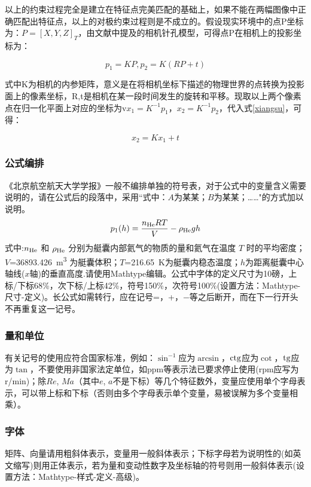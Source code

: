\documentclass[10.5pt,twocolumn]{jbuaa}
\begin{document}
以上的约束过程完全是建立在特征点完美匹配的基础上，如果不能在两幅图像中正确匹配出特征点，以上的对极约束过程则是不成立的。假设现实环境中的点P坐标为：$ P = [X,Y,Z]_{T} $，由文献\cite{gaoxiang14slam}中提及的相机针孔模型，可得点P在相机上的投影坐标为：

\begin{equation}
\label{xiangsu}
p_{1} = KP,p_{2} = K(RP+t)
\end{equation}

式中K为相机的内参矩阵，意义是在将相机坐标下描述的物理世界的点转换为投影面上的像素坐标，R,t是相机在某一段时间发生的旋转和平移。现取以上两个像素点在归一化平面上对应的坐标为v$ x_{1} = K^{-1}p_{1} $，$ x_{2} = K^{-1}p_{2} $，代入式\ref{xiangsu}，可得：

\begin{equation}
\label{guiyi}
x_{2} = Kx_{1}+t
\end{equation}


\subsubsection{公式编排}
\label{labSecForm}
《北京航空航天大学学报》一般不编排单独的符号表，对于公式中的变量含义需要说明的，请在公式后的段落中，采用``式中：$A$为某某；$B$为某某；……"的方式加以说明。
\begin{equation}
\label{eqnLabelp}
p_1 (h) = \dfrac{n_{\textnormal{He}}RT}{V}-\rho_{\textnormal{He}}gh
\end{equation}
式中:$n_{\textnormal{He}}$ 和 $\rho_{\textnormal{He}}$ 分别为艇囊内部氦气的物质的量和氦气在温度 $T$ 时的平均密度；
$V$=\SI{36893.426}{\cubic\meter}%
为艇囊体积；$T$=\SI{216.65}{\kelvin}为艇囊内稳态温度；$h$为距离艇囊中心轴线($x$轴)的垂直高度.请使用Mathtype编辑。公式中字体的定义尺寸为10磅，上标/下标68\%，次下标/上标42\%，符号150\%，次符号100\%(设置方法：Mathtype-尺寸-定义)。长公式如需转行，应在记号=，+，$-$等之后断开，而在下一行开头不再重复这一记号。

\subsubsection{量和单位}
有关记号的使用应符合国家标准，例如：$\sin^{-1}$应为$\arcsin$，$\rm ctg$应为$\cot$，$\rm tg$应为$\tan$，不要使用非国家法定单位，如ppm等表示法已要求停止使用(rpm应写为r/min)；除$Re$, $Ma$（其中$e$, $a$不是下标）等几个特征数外，变量应使用单个字母表示，可以带上标和下标（否则由多个字母表示单个变量，易被误解为多个变量相乘）。

\subsubsection{字体}
矩阵、向量请用粗斜体表示，变量用一般斜体表示；下标字母若为说明性的(如英文缩写)则用正体表示，若为量和变动性数字及坐标轴的符号则用一般斜体表示(设置方法：Mathtype-样式-定义-高级)。
\end{document}
